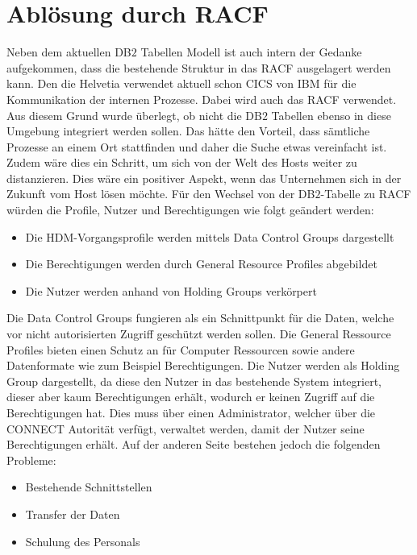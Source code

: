 \section{Ablösung durch RACF}
\label{sec:chapter05:racF}
Neben dem aktuellen DB$2$ Tabellen Modell ist auch intern der Gedanke aufgekommen, dass die bestehende Struktur in das \ac{RACF} ausgelagert werden kann.
Den die Helvetia verwendet aktuell schon \ac{CICS} von IBM für die Kommunikation der internen Prozesse.
Dabei wird auch das \ac{RACF} verwendet.
Aus diesem Grund wurde überlegt, ob nicht die DB$2$ Tabellen ebenso in diese Umgebung integriert werden sollen.
Das hätte den Vorteil, dass sämtliche Prozesse an einem Ort stattfinden und daher die Suche etwas vereinfacht ist.
Zudem wäre dies ein Schritt, um sich von der Welt des Hosts weiter zu distanzieren.
Dies wäre ein positiver Aspekt, wenn das Unternehmen sich in der Zukunft vom Host lösen möchte.
\newline
\newline
Für den Wechsel von der DB$2$-Tabelle zu \ac{RACF} würden die Profile, Nutzer und Berechtigungen wie folgt geändert werden:
\begin{itemize}
	\item Die HDM-Vorgangsprofile werden mittels Data Control Groups dargestellt
	\item Die Berechtigungen werden durch General Resource Profiles abgebildet
	\item Die Nutzer werden anhand von Holding Groups verkörpert
\end{itemize}
Die Data Control Groups fungieren als ein Schnittpunkt für die Daten, welche vor nicht autorisierten Zugriff geschützt werden sollen. \cite{IBMdcg}
Die General Ressource Profiles bieten einen Schutz an für Computer Ressourcen sowie andere Datenformate wie zum Beispiel Berechtigungen. \cite{IBMgrp}
Die Nutzer werden als Holding Group dargestellt, da diese den Nutzer in das bestehende System integriert, dieser aber kaum Berechtigungen erhält, wodurch er keinen Zugriff auf die Berechtigungen hat.
Dies muss über einen Administrator, welcher über die CONNECT Autorität verfügt, verwaltet werden, damit der Nutzer seine Berechtigungen erhält. \cite{IBMhg}
\newline
\newline
Auf der anderen Seite bestehen jedoch die folgenden Probleme:
\begin{itemize}
	\item Bestehende Schnittstellen
	\item Transfer der Daten
	\item Schulung des Personals
\end{itemize}
